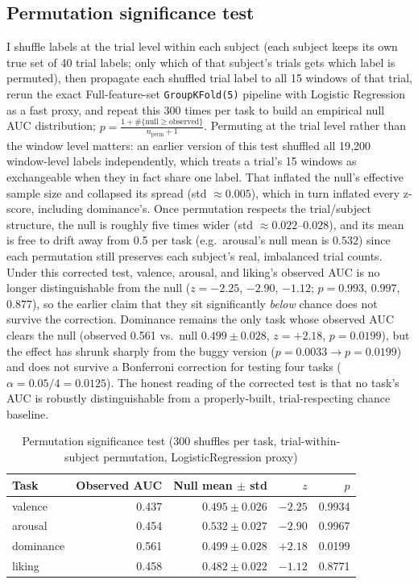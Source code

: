 \documentclass[11pt]{report}
\begin{document}
\subsection{Permutation significance test}
\label{sec:s16-1}
I shuffle labels at the trial level within each subject (each subject keeps
its own true set of 40 trial labels; only which of that subject's trials
gets which label is permuted), then propagate each shuffled trial label to
all 15 windows of that trial, rerun the exact Full-feature-set
\texttt{GroupKFold(5)} pipeline with Logistic Regression as a fast proxy, and
repeat this 300 times per task to build an empirical null AUC distribution;
$p = \frac{1 + \#\{\text{null} \ge \text{observed}\}}{n_{\text{perm}}+1}$.
Permuting at the trial level rather than the window level matters: an
earlier version of this test shuffled all 19{,}200 window-level labels
independently, which treats a trial's 15 windows as exchangeable when they
in fact share one label. That inflated the null's effective sample size and
collapsed its spread (std $\approx0.005$), which in turn inflated every
z-score, including dominance's. Once permutation respects the trial/subject
structure, the null is roughly five times wider (std
$\approx0.022$--$0.028$), and its mean is free to drift away from 0.5 per
task (e.g.\ arousal's null mean is $0.532$) since each permutation still
preserves each subject's real, imbalanced trial counts. Under this corrected
test, valence, arousal, and liking's observed AUC is no longer
distinguishable from the null ($z=-2.25$, $-2.90$, $-1.12$; $p=0.993$,
$0.997$, $0.877$), so the earlier claim that they sit significantly
\emph{below} chance does not survive the correction. Dominance remains the
only task whose observed AUC clears the null (observed 0.561 vs.\ null
$0.499\pm0.028$, $z=+2.18$, $p=0.0199$), but the effect has shrunk sharply
from the buggy version ($p=0.0033\to p=0.0199$) and does not survive a
Bonferroni correction for testing four tasks ($\alpha=0.05/4=0.0125$). The
honest reading of the corrected test is that no task's AUC is robustly
distinguishable from a properly-built, trial-respecting chance baseline.

\begin{table}[H]
\centering
\caption{Permutation significance test (300 shuffles per task, trial-within-subject permutation, LogisticRegression proxy)}
\label{tab:significance}
\begin{tabular}{lrrrr}
\toprule
Task & Observed AUC & Null mean $\pm$ std & $z$ & $p$ \\
\midrule
valence   & 0.437 & $0.495\pm0.026$ & $-2.25$ & 0.9934 \\
arousal   & 0.454 & $0.532\pm0.027$ & $-2.90$ & 0.9967 \\
dominance & 0.561 & $0.499\pm0.028$ & $+2.18$ & 0.0199 \\
liking    & 0.458 & $0.482\pm0.022$ & $-1.12$ & 0.8771 \\
\bottomrule
\end{tabular}
\end{table}
\end{document}
